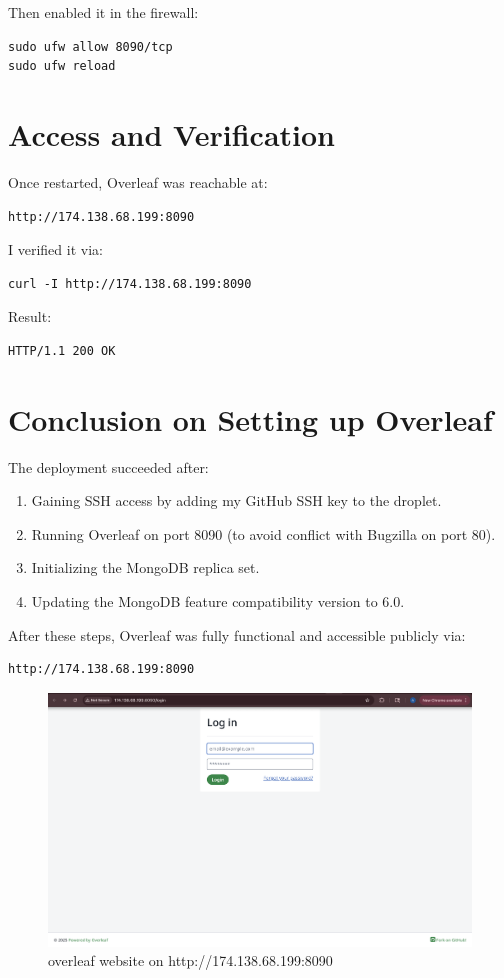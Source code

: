 Then enabled it in the firewall:
\begin{verbatim}
sudo ufw allow 8090/tcp
sudo ufw reload
\end{verbatim}

\section{Access and Verification}
Once restarted, Overleaf was reachable at:
\begin{verbatim}
http://174.138.68.199:8090
\end{verbatim}

I verified it via:
\begin{verbatim}
curl -I http://174.138.68.199:8090
\end{verbatim}

Result:
\begin{verbatim}
HTTP/1.1 200 OK
\end{verbatim}

\section{Conclusion on Setting up Overleaf}
The deployment succeeded after:
\begin{enumerate}
  \item Gaining SSH access by adding my GitHub SSH key to the droplet.
  \item Running Overleaf on port 8090 (to avoid conflict with Bugzilla on port 80).
  \item Initializing the MongoDB replica set.
  \item Updating the MongoDB feature compatibility version to 6.0.
\end{enumerate}

After these steps, Overleaf was fully functional and accessible publicly via:
\begin{verbatim}
http://174.138.68.199:8090
\end{verbatim}

\begin{figure}
    \centering
    \includegraphics[width=1.0\linewidth]{png/overleaf running.png}
    \caption{overleaf website on http://174.138.68.199:8090}
    \label{fig:placeholder}
\end{figure}

